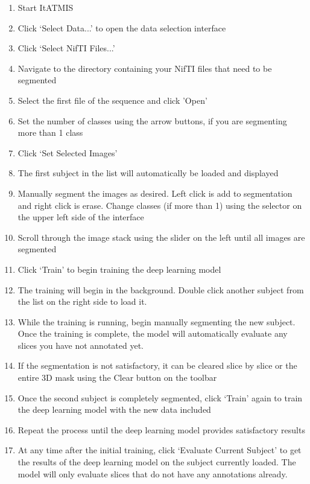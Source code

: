 \documentclass[twoside,a4paper]{refart}
\begin{document}
\begin{enumerate}
	\item Start ItATMIS
	\item Click `Select Data...' to open the data selection interface
	\item Click `Select NifTI Files...'
	\item Navigate to the directory containing your NifTI files that need to be segmented
	\item Select the first file of the sequence and click 'Open'
	\item Set the number of classes using the arrow buttons, if you are segmenting more than 1 class
	\item Click `Set Selected Images'
	\item The first subject in the list will automatically be loaded and displayed
	\item Manually segment the images as desired. Left click is add to segmentation and right click is erase. Change classes (if more than 1) 			using the selector on the upper left side of the interface
	\item Scroll through the image stack using the slider on the left until all images are segmented
	\item Click `Train' to begin training the deep learning model
	\item The training will begin in the background. Double click another subject from the list on the right side to load it.
	\item While the training is running, begin manually segmenting the new subject. Once the training is complete, the model will 					automatically evaluate any slices you have not annotated yet.
	\item If the segmentation is not satisfactory, it can be cleared slice by slice or the entire 3D mask using the Clear button on the toolbar
	\item Once the second subject is completely segmented, click `Train' again to train the deep learning model with the new data included
	\item Repeat the process until the deep learning model provides satisfactory results
	\item At any time after the initial training, click `Evaluate Current Subject' to get the results of the deep learning model on the subject 			currently loaded. The model will only evaluate slices that do not have any annotations already.

\end{enumerate}
\end{document}
